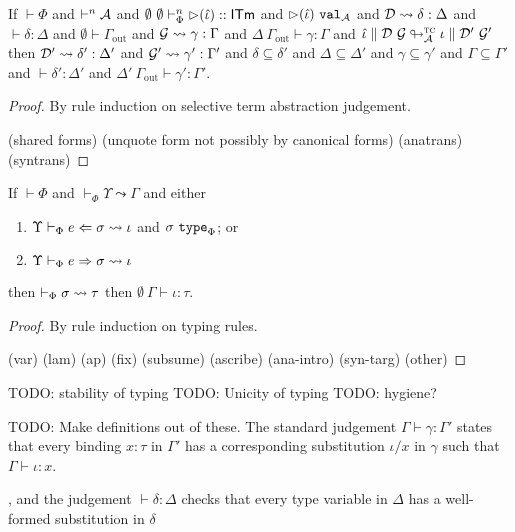 \documentclass{llncs}
\begin{document}
\begin{lemma}
If $\vdash \Phi$ and $\vdash^n \mathcal{A}$ and $\emptyset~\emptyset \vdash_{\Phi}^{n} {\rhd}(\hat{\iota}) :: {\sf ITm}$ and ${\rhd}(\hat{\iota})~\mathtt{val}_{\mathcal{A}}$ and $\mathcal{D} \leadsto \delta : \Delta$ and $\vdash \delta : \Delta$ and $\emptyset \vdash \Gamma_\text{out}$ and $\mathcal{G} \leadsto \gamma : \Gamma$ and $\Delta~\Gamma_\text{out} \vdash \gamma : \Gamma$ and $\hat{\iota} \parallel \mathcal{D}~\mathcal{G} \looparrowright^{\textsc{tc}}_{\mathcal{A}} \iota \parallel \mathcal{D}'~\mathcal{G}'$ then $\mathcal{D}' \leadsto \delta' : \Delta'$ and $\mathcal{G}' \leadsto \gamma' : \Gamma'$ and $\delta \subseteq \delta'$ and $\Delta \subseteq \Delta'$ and $\gamma \subseteq \gamma'$ and $\Gamma \subseteq \Gamma'$ and $\vdash \delta' : \Delta'$ and $\Delta'~\Gamma_\text{out} \vdash \gamma' : \Gamma'$.
\end{lemma}
\begin{proof} By rule induction on selective term abstraction judgement.

(shared forms) (unquote form not possibly by canonical forms) (anatrans) (syntrans)
\end{proof}

\begin{theorem}
If $\vdash \Phi$ and $\vdash_\Phi \Upsilon \leadsto \Gamma$ and either
\begin{enumerate}
\item $\Upsilon \vdash_{\Phi} e \Leftarrow \sigma \leadsto \iota$ and $\sigma~\texttt{type}_{\Phi}$; or 
\item $\Upsilon \vdash_{\Phi} e \Rightarrow \sigma \leadsto \iota$
\end{enumerate}
then $\vdash_\Phi \sigma \leadsto \tau$ then $\emptyset~\Gamma \vdash \iota : \tau$.
\end{theorem}
\begin{proof} By rule induction on typing rules.

(var) (lam) (ap) (fix) (subsume) (ascribe) (ana-intro) (syn-targ) (other)
\end{proof}

TODO: stability of typing
TODO: Unicity of typing
TODO: hygiene? 

TODO: Make definitions out of these.
The standard judgement $\Gamma \vdash \gamma : \Gamma'$ states that every binding $x : \tau$ in $\Gamma'$ has a corresponding substitution $\iota/x$ in $\gamma$ such that $\Gamma \vdash \iota : x$.  

, and  the judgement $\vdash \delta : \Delta$ checks that every type variable in $\Delta$ has a well-formed substitution in $\delta$
\end{document}
